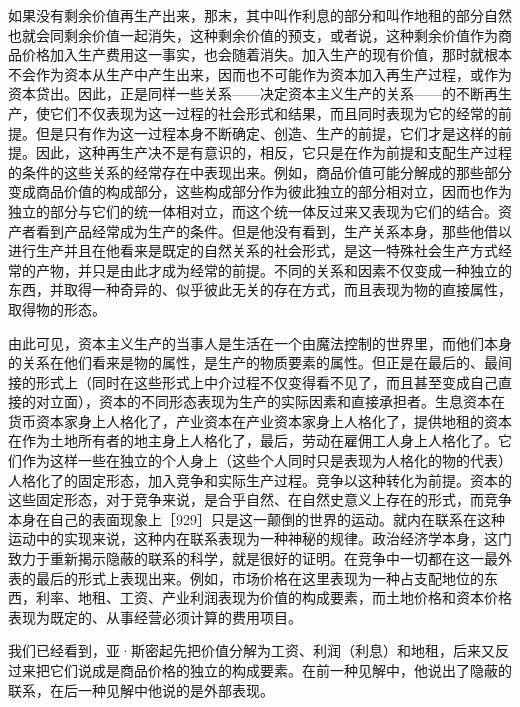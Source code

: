 如果没有剩余价值再生产出来，那末，其中叫作利息的部分和叫作地租的部分自然也就会同剩余价值一起消失，这种剩余价值的预支，或者说，这种剩余价值作为商品价格加入生产费用这一事实，也会随着消失。加入生产的现有价值，那时就根本不会作为资本从生产中产生出来，因而也不可能作为资本加入再生产过程，或作为资本贷出。因此，正是同样一些关系——决定资本主义生产的关系——的不断再生产，使它们不仅表现为这一过程的社会形式和结果，而且同时表现为它的经常的前提。但是只有作为这一过程本身不断确定、创造、生产的前提，它们才是这样的前提。因此，这种再生产决不是有意识的，相反，它只是在作为前提和支配生产过程的条件的这些关系的经常存在中表现出来。例如，商品价值可能分解成的那些部分变成商品价值的构成部分，这些构成部分作为彼此独立的部分相对立，因而也作为独立的部分与它们的统一体相对立，而这个统一体反过来又表现为它们的结合。资产者看到产品经常成为生产的条件。但是他没有看到，生产关系本身，那些他借以进行生产并且在他看来是既定的自然关系的社会形式，是这一特殊社会生产方式经常的产物，并只是由此才成为经常的前提。不同的关系和因素不仅变成一种独立的东西，并取得一种奇异的、似乎彼此无关的存在方式，而且表现为物的直接属性，取得物的形态。

由此可见，资本主义生产的当事人是生活在一个由魔法控制的世界里，而他们本身的关系在他们看来是物的属性，是生产的物质要素的属性。但正是在最后的、最间接的形式上（同时在这些形式上中介过程不仅变得看不见了，而且甚至变成自己直接的对立面），资本的不同形态表现为生产的实际因素和直接承担者。生息资本在货币资本家身上人格化了，产业资本在产业资本家身上人格化了，提供地租的资本在作为土地所有者的地主身上人格化了，最后，劳动在雇佣工人身上人格化了。它们作为这样一些在独立的个人身上（这些个人同时只是表现为人格化的物的代表）人格化了的固定形态，加入竞争和实际生产过程。竞争以这种转化为前提。资本的这些固定形态，对于竞争来说，是合乎自然、在自然史意义上存在的形式，而竞争本身在自己的表面现象上［929］只是这一颠倒的世界的运动。就内在联系在这种运动中的实现来说，这种内在联系表现为一种神秘的规律。政治经济学本身，这门致力于重新揭示隐蔽的联系的科学，就是很好的证明。在竞争中一切都在这一最外表的最后的形式上表现出来。例如，市场价格在这里表现为一种占支配地位的东西，利率、地租、工资、产业利润表现为价值的构成要素，而土地价格和资本价格表现为既定的、从事经营必须计算的费用项目。

我们已经看到，亚·斯密起先把价值分解为工资、利润（利息）和地租，后来又反过来把它们说成是商品价格的独立的构成要素。在前一种见解中，他说出了隐蔽的联系，在后一种见解中他说的是外部表现。

